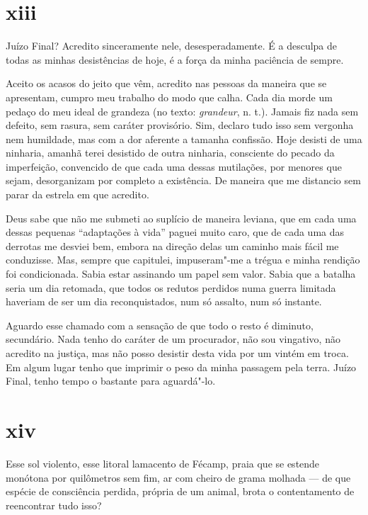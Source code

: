 \section{xiii}

Juízo Final? Acredito sinceramente nele, desesperadamente. É a desculpa
de todas as minhas desistências de hoje, é a força da minha paciência de
sempre.

Aceito os acasos do jeito que vêm, acredito nas pessoas da maneira que
se apresentam, cumpro meu trabalho do modo que calha. Cada dia morde um
pedaço do meu ideal de grandeza (no texto: \emph{grandeur}, n. t.).
Jamais fiz nada sem defeito, sem rasura, sem caráter provisório. Sim,
declaro tudo isso sem vergonha nem humildade, mas com a dor aferente a
tamanha confissão. Hoje desisti de uma ninharia, amanhã terei desistido
de outra ninharia, consciente do pecado da imperfeição, convencido de
que cada uma dessas mutilações, por menores que sejam, desorganizam por
completo a existência. De maneira que me distancio sem parar da estrela
em que acredito.

Deus sabe que não me submeti ao suplício de maneira leviana, que em cada
uma dessas pequenas ``adaptações à vida'' paguei muito caro, que de
cada uma das derrotas me desviei bem, embora na direção delas um
caminho mais fácil me conduzisse. Mas, sempre que capitulei,
impuseram"-me a trégua e minha rendição foi condicionada. Sabia estar
assinando um papel sem valor. Sabia que a batalha seria um dia retomada,
que todos os redutos perdidos numa guerra limitada haveriam de ser um
dia reconquistados, num só assalto, num só instante.

Aguardo esse chamado com a sensação de que todo o resto é diminuto,
secundário. Nada tenho do caráter de um procurador, não sou vingativo,
não acredito na justiça, mas não posso desistir desta vida por um vintém
em troca. Em algum lugar tenho que imprimir o peso da minha passagem
pela terra. Juízo Final, tenho tempo o bastante para aguardá"-lo.

\section{xiv}


Esse sol violento, esse litoral lamacento de Fécamp, praia que se
estende monótona por quilômetros sem fim, ar com cheiro de grama
molhada --- de que espécie de consciência perdida, própria de um animal,
brota o contentamento de reencontrar tudo isso?

